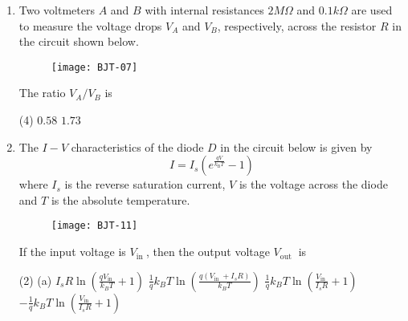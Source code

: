 \begin{enumerate}
\begin{tasks}
\begin{figure}[H]
			\centering
			\texttt{[image: BJT-06]}
		\end{figure}
	\end{tasks}
	The material that would make the most sensitive temperature sensor, when used at temperatures between $T_{1}$ and $T_{2}$, is
	{}
	\begin{tasks}(4)
		\task[\textbf{A.}] A
		\task[\textbf{B.}] B
		\task[\textbf{C.}] C
		\task[\textbf{D.}] D
	\end{tasks}
	\item Two voltmeters $A$ and $B$ with internal resistances $2 M \Omega$ and $0.1 k \Omega$ are used to measure the voltage drops $V_{A}$ and $V_{B}$, respectively, across the resistor $R$ in the circuit shown below.\\
	\begin{figure}[H]
		\centering
		\texttt{[image: BJT-07]}
	\end{figure}
	The ratio $V_{A} / V_{B}$ is
	{}
	\begin{tasks}(4)
		\task[\textbf{A.}] $0.58$
		\task[\textbf{B.}] $1.73$
	\end{tasks}
	\item The $I-V$ characteristics of the diode $D$ in the circuit below is given by
	$$
	I=I_{s}\left(e^{\frac{q V}{k_{\mathrm{B}} T}}-1\right)
	$$
	where $I_{s}$ is the reverse saturation current, $V$ is the voltage across the diode and $T$ is the absolute temperature.\\
	\begin{figure}[H]
		\centering
		\texttt{[image: BJT-11]}
	\end{figure}
	If the input voltage is $V_{\text {in }}$, then the output voltage $V_{\text {out }}$ is
	{}
	\begin{tasks}(2)
		\task[\textbf{A.}] (a) $I_{s} R \ln \left(\frac{q V_{\text {in }}}{k_{B} T}+1\right)$
		\task[\textbf{B.}] $\frac{1}{q} k_{B} T \ln \left(\frac{q\left(V_{\text {in }}+I_{s} R\right)}{k_{B} T}\right)$
		\task[\textbf{C.}]  $\frac{1}{q} k_{B} T \ln \left(\frac{V_{\text {in }}}{I_{s} R}+1\right)$
		\task[\textbf{D.}]  $-\frac{1}{q} k_{B} T \ln \left(\frac{V_{\text {in }}}{I_{s} R}+1\right)$
	\end{tasks}
\end{enumerate}
\setlength\arrayrulewidth{1pt}
